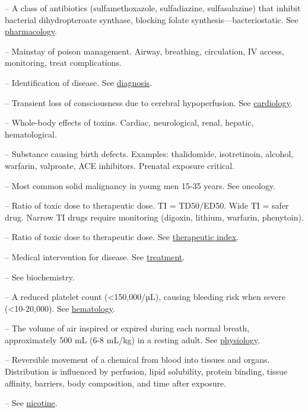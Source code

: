 -- A class of antibiotics (sulfamethoxazole, sulfadiazine, sulfasalazine) that inhibit bacterial dihydropteroate synthase, blocking folate synthesis—bacteriostatic. See \hyperlink{Pharmacology}{pharmacology}.

-- Mainstay of poison management. Airway, breathing, circulation, IV access, monitoring, treat complications.

-- Identification of disease. See \hyperlink{Diagnosis}{diagnosis}.

-- Transient loss of consciousness due to cerebral hypoperfusion. See \hyperlink{Cardiology}{cardiology}.

-- Whole-body effects of toxins. Cardiac, neurological, renal, hepatic, hematological.

-- Substance causing birth defects. Examples: thalidomide, isotretinoin, alcohol, warfarin, valproate, ACE inhibitors. Prenatal exposure critical.

-- Most common solid malignancy in young men 15-35 years. See oncology.

-- Ratio of toxic dose to therapeutic dose. TI = TD50/ED50. Wide TI = safer drug. Narrow TI drugs require monitoring (digoxin, lithium, warfarin, phenytoin).

-- Ratio of toxic dose to therapeutic dose. See \hyperlink{Therapeutic Index}{therapeutic index}.

-- Medical intervention for disease. See \hyperlink{Treatment}{treatment}.

-- See biochemistry.

-- A reduced platelet count (<150,000/µL), causing bleeding risk when severe (<10-20,000). See \hyperlink{hematology}{hematology}.

-- The volume of air inspired or expired during each normal breath, approximately 500 mL (6-8 mL/kg) in a resting adult. See \hyperlink{Physiology}{physiology}.

-- Reversible movement of a chemical from blood into tissues and organs. Distribution is influenced by perfusion, lipid solubility, protein binding, tissue affinity, barriers, body composition, and time after exposure.

-- See \hyperlink{Nicotine}{nicotine}.

